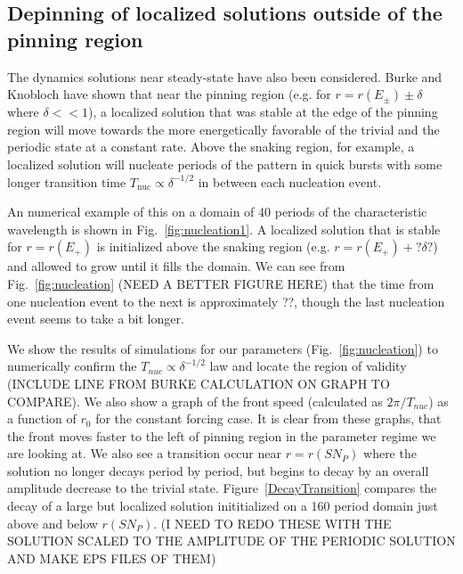 \documentclass[../main/TimeForcingSHE.tex]{subfiles}
\begin{document}
\subsection{Depinning of localized solutions outside of the pinning region}
The dynamics solutions near steady-state have also been considered.  Burke and Knobloch \cite{burke2006} have shown that near the pinning region (e.g. for $r=r(E_{\pm})\pm\delta$ where $\delta <<1$), a localized solution that was stable at the edge of the pinning region will move towards the more energetically favorable of the trivial and the periodic state at a constant rate.  Above the snaking region, for example, a localized solution will nucleate periods of the pattern in quick bursts with some longer transition time $T_{\text{nuc}}\propto \delta^{-1/2}$ in between each nucleation event.  

An numerical example of this on a domain of 40 periods of the characteristic wavelength is shown in Fig.~\ref{fig:nucleation1}.  A localized solution that is stable for $r=r(E_+)$ is initialized above the snaking region (e.g. $r=r(E_+)+ ?\delta?$) and allowed to grow until it fills the domain. 
\FIGnucleationONE
We can see from Fig.~\ref{fig:nucleation} (NEED A BETTER FIGURE HERE) that the time from one nucleation event to the next is approximately ??, though the last nucleation event seems to take a bit longer.  %

\FIGnucleation

We show the results of simulations  for our parameters (Fig.~\ref{fig:nucleation}) to numerically confirm the $T_{nuc}\propto \delta^{-1/2}$ law  and locate the region of validity (INCLUDE LINE FROM BURKE CALCULATION ON GRAPH TO COMPARE).  We also show a graph of the front speed (calculated as $2 \pi / T_{nuc}$) as a function of $r_0$ for the constant forcing case.   It is clear from these graphs, that the front moves faster to the left of pinning region in the parameter regime we are looking at.  We also see a transition occur near $r=r(SN_P)$ where the solution no longer decays period by period, but begins to decay by an overall amplitude decrease to the trivial state.  Figure~\ref{DecayTransition} compares the decay of a large but localized solution inititialized on a 160 period domain just above and below $r(SN_P)$. (I NEED TO REDO THESE WITH THE SOLUTION SCALED TO THE AMPLITUDE OF THE PERIODIC SOLUTION AND MAKE EPS FILES OF THEM)
\FIGdecaytransition
\end{document}
